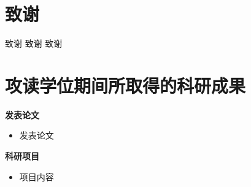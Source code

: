 


\linespread{1.4}\selectfont



\clearpage{\pagestyle{empty}\cleardoublepage}
\chapter*{致谢}


致谢
致谢
致谢



\clearpage{\pagestyle{empty}\cleardoublepage}
\chapter*{攻读学位期间所取得的科研成果}

    {\bfseries 发表论文}

\begin{itemize}
    \item 发表论文

\end{itemize}    

{\bfseries 科研项目}
\begin{itemize}
    \item 项目内容
\end{itemize}
